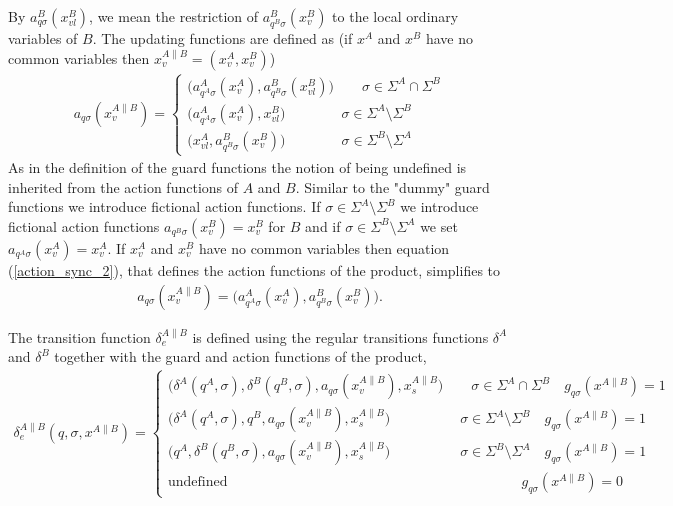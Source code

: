 \documentclass{article}
\begin{document}
By $a^B_{q \sigma}(x^{B}_{vl})$, we mean the restriction of
$a^B_{q^B \sigma}(x^{B}_{v})$ to the local ordinary variables of
$B$. The updating functions are defined as (if $x^{A}$ and $x^{B}$
have no common variables then $x^{A\|B}_v=(x^{A}_v,x^{B}_v)$)
\begin{eqnarray}\label{action_sync_2}
a_{q \sigma}(x^{A\|B}_v)=\left\{
\begin{array}{ll}
 \big(a^A_{q^A \sigma}(x^{A}_v), a^B_{q^B \sigma}(x^{B}_{vl})\big)\quad\quad\sigma\in \Sigma^A \cap \Sigma^B\\
\big(a^A_{q^A \sigma}(x^{A}_v), x^{B}_{vl}\big)\quad\quad\quad\quad\sigma\in \Sigma^A \setminus \Sigma^B\\
\big(x^{A}_{vl}, a^B_{q^B
\sigma}(x^{B}_v)\big)\quad\quad\quad\quad\sigma\in \Sigma^B
\setminus \Sigma^A
\end{array}\right.
\end{eqnarray}
As in the definition of the guard functions the notion of being
undefined is inherited from the action functions of $A$ and $B$.
Similar to the "dummy" guard functions we introduce fictional
action functions. If $\sigma\in \Sigma^A \setminus \Sigma^B$ we
introduce fictional action functions $a_{q^B\sigma}(x^B_v)=x^B_v$
for $B$ and if $\sigma\in\Sigma^B\setminus \Sigma^A$ we set
$a_{q^A\sigma}(x^A_v)=x^A_v$. If $x^{A}_v$ and $x^{B}_v$ have no
common variables then equation (\ref{action_sync_2}), that defines
the action functions of the product, simplifies to
\begin{eqnarray}
a_{q \sigma}(x^{A\|B}_v)=
 \big(a^A_{q^A \sigma}(x^{A}_v), a^B_{q^B \sigma}(x^{B}_v)\big).
\end{eqnarray}


 The transition function
$\delta^{A\|B}_e$ is defined using the regular transitions
functions $\delta^A$ and $\delta^B$ together with the guard and
action functions of the product,
\begin{eqnarray}
\delta^{A\|B}_{e}(q,\sigma,x^{A\|B})=\left\{
\begin{array}{ll}
\big(\delta^A(q^A,\sigma),\delta^B(q^B,\sigma),a_{q \sigma}(x^{A\|B}_v), x^{A\|B}_s \big) \quad\quad \sigma\in \Sigma^A \cap \Sigma^B \quad g_{q \sigma}(x^{A\|B})=1\\
\big(\delta^A(q^A,\sigma),q^B,a_{q \sigma}(x^{A\|B}_v), x^{A\|B}_s\big) \quad\quad\quad\quad\quad \sigma\in \Sigma^A \setminus \Sigma^B \quad g_{q \sigma}(x^{A\|B})=1\\
\big(q^A,\delta^B(q^B,\sigma),a_{q \sigma}(x^{A\|B}_v), x^{A\|B}_s\big) \quad\quad\quad\quad\quad \sigma\in \Sigma^B \setminus \Sigma^A \quad g_{q \sigma}(x^{A\|B})=1\\
\textrm{
undefined}\quad\quad\quad\quad\quad\quad\quad\quad\quad\quad\quad\quad\quad\quad\quad\quad\quad\quad\quad\quad\quad
g_{q\sigma}(x^{A\|B})=0
\end{array}\right.
\end{eqnarray}
\end{document}
